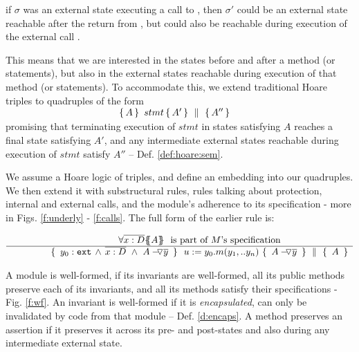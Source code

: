 \Eg if $\sigma$ was an external state executing a call to , then $\sigma'$ could be an external state reachable 
after the return from , but could also be reachable
during execution of the external call .

This means that we are  interested in the states before and after a method (or statements), but  also  in the external states reachable during execution of that method (or statements).
To accommodate this, we extend   traditional Hoare triples to quadruples of the form\\
 $\strut \ \hspace{4cm} \quadruple {A} {\, stmt\, }{A'} {A''}$\\  
 promising that terminating execution of $stmt$ in  states satisfying $A$  reaches  a  final state satisfying $A'$, and any intermediate external states reachable during execution of $stmt$ satisfy    $A''$ -- \cf Def. \ref{def:hoare:sem}.

\vspace{.1cm}

We assume a  Hoare logic of  triples, and define an embedding into our quadruples. 
We then extend it with substructural rules, rules talking about protection, internal and external calls, 
and the module's adherence to its 
specification - more in Figs. \ref{f:underly} -  \ref{f:calls}. %
The full form of  the  earlier %
 rule %
 is:
 
 $\inferruleNoName  
 	{ 
   	   {\TwoStatesN {\overline {x:D}} {A}}\ \   \mbox{is part of $M$'s specification}
        }
	{   \quadruple { \    { \external{y_0}} \,     \wedge \,  \overline{x:D}\  \wedge\  {\PushAS {y}{A}}\ }  
						{ \ u:=y_0.m(y_1,.. y_n)\    }
						{ \    {\PushAS {y}{A}}  \ }
						{\  A  \ }
         }
$
 
 \vspace{.2cm}
A module is well-formed, if  its invariants are well-formed,  all  its public methods preserve each of its invariants, and  all its methods satisfy their specifications - \cf  Fig.  \ref{f:wf}.
%
An invariant is well-formed if %
it is \emph{encapsulated}, \ie can only be invalidated by code from that module -- \cf Def. \ref{d:encaps}. 
% 
A method preserves an assertion   if it preserves it across its pre- and post-states and also during any intermediate external state.

